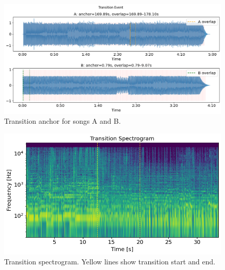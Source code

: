 \documentclass[14pt]{extarticle}
\begin{document}
\begin{figure}[H]
    \centering
    \includegraphics[width=\textwidth]{figures/transition.png}
    \caption{Transition anchor for songs A and B.}
\end{figure}

\begin{figure}[H]
    \centering
    \includegraphics[width=\textwidth]{figures/spectogram.png}
    \caption{Transition spectrogram. Yellow lines show transition start and end.}
\end{figure}
\end{document}
